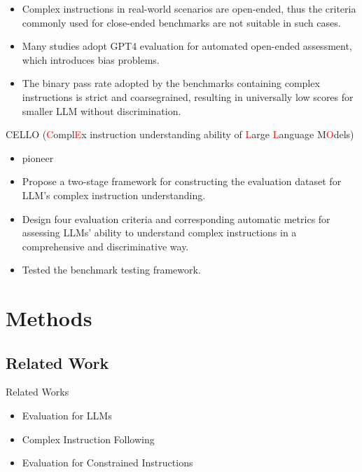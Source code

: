 \documentclass{beamer}
\begin{document}
\begin{frame}
    \begin{itemize}
        \item {Complex instructions in real-world scenarios are open-ended, thus the criteria commonly used for close-ended benchmarks are not suitable in such cases.}
        \item {Many studies adopt GPT4 evaluation for automated open-ended assessment, which introduces bias problems.}
        \item {The binary pass rate adopted by the benchmarks containing complex instructions is strict and coarsegrained, resulting in universally low scores for smaller LLM without discrimination.}
    \end{itemize}
\end{frame}

\begin{frame}{CELLO (\textcolor{red}{C}ompl\textcolor{red}{E}x instruction understanding ability of \textcolor{red}{L}arge \textcolor{red}{L}anguage M\textcolor{red}{O}dels)}
    \begin{itemize}
        \item {pioneer}
        \item {Propose a two-stage framework for constructing the evaluation dataset for LLM’s complex instruction understanding.}
        \item {Design four evaluation criteria and corresponding automatic metrics for assessing LLMs’ ability to understand complex instructions in a comprehensive and discriminative way.}
        \item {Tested the benchmark testing framework.}
    \end{itemize}
\end{frame}

\section{Methods}

\subsection{Related Work}

\begin{frame}{Related Works}
    \begin{itemize}
        \item {Evaluation for LLMs}
        \item {Complex Instruction Following}
        \item {Evaluation for Constrained Instructions}
    \end{itemize}
\end{frame}
\end{document}
